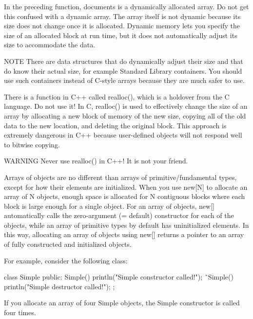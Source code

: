 In the preceding function, documents is a dynamically allocated array. Do not get this confused with a dynamic array. The array itself is not dynamic because its size does not change once it is allocated. Dynamic memory lets you specify the size of an allocated block at run time, but it does not automatically adjust its size to accommodate the data.

\begin{myNotic}{NOTE}
There are data structures that do dynamically adjust their size and that do know their actual size, for example Standard Library containers. You should use such containers instead of C-style arrays because they are much safer to use.
\end{myNotic}

There is a function in C++ called realloc(), which is a holdover from the C language. Do not use it! In C, realloc() is used to effectively change the size of an array by allocating a new block of memory of the new size, copying all of the old data to the new location, and deleting the original block. This approach is extremely dangerous in C++ because user-defined objects will not respond well to bitwise copying.

\begin{myWarning}{WARNING}
Never use realloc() in C++! It is not your friend.
\end{myWarning}


Arrays of objects are no different than arrays of primitive/fundamental types, except for how their elements are initialized. When you use new[N] to allocate an array of N objects, enough space is allocated for N contiguous blocks where each block is large enough for a single object. For an array of objects, new[] automatically calls the zero-argument (= default) constructor for each of the objects, while an array of primitive types by default has uninitialized elements. In this way, allocating an array of objects using new[] returns a pointer to an array of fully constructed and initialized objects.

For example, consider the following class:

\begin{cpp}
class Simple
{
    public:
        Simple() { println("Simple constructor called!"); }
        ˜Simple() { println("Simple destructor called!"); }
};
\end{cpp}

If you allocate an array of four Simple objects, the Simple constructor is called four times.

